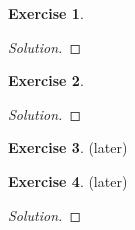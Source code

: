 \documentclass[12pt,a4]{article}
\theoremstyle{definition}
\newtheorem{exercise}{Exercise}
\begin{document}
\begin{exercise}
	
\end{exercise}
\begin{proof}[Solution]
	
\end{proof}

\begin{exercise}
	
\end{exercise}
\begin{proof}[Solution]
	
\end{proof}

\begin{exercise}
	(later) 
\end{exercise}

\begin{exercise}
	(later) 
\end{exercise}
\begin{proof}[Solution]
	
\end{proof}
\end{document}
